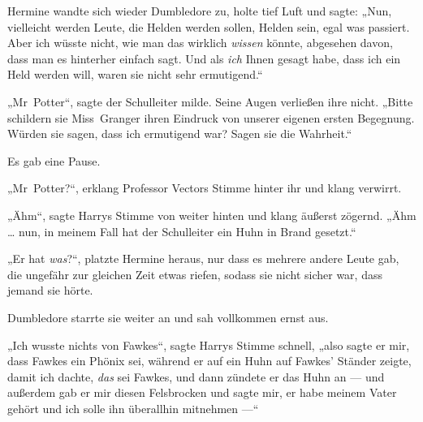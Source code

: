 Hermine wandte sich wieder Dumbledore zu, holte tief Luft und sagte:
„Nun, vielleicht werden Leute, die Helden werden sollen, Helden sein, egal was passiert. Aber ich wüsste nicht, wie man das wirklich \emph{wissen} könnte, abgesehen davon, dass man es hinterher einfach sagt. Und als \emph{ich} Ihnen gesagt habe, dass ich ein Held werden will, waren sie nicht sehr ermutigend.“

„Mr~Potter“, sagte der Schulleiter milde. Seine Augen verließen ihre nicht.
„Bitte schildern sie Miss~Granger ihren Eindruck von unserer eigenen ersten Begegnung. Würden sie sagen, dass ich ermutigend war? Sagen sie die Wahrheit.“

Es gab eine Pause.

„Mr~Potter?“, erklang Professor Vectors Stimme hinter ihr und klang verwirrt.

„Ähm“, sagte Harrys Stimme von weiter hinten und klang äußerst zögernd. „Ähm … nun, in meinem Fall hat der Schulleiter ein Huhn in Brand gesetzt.“

„Er hat \emph{was}?“, platzte Hermine heraus, nur dass es mehrere andere Leute gab, die ungefähr zur gleichen Zeit etwas riefen, sodass sie nicht sicher war, dass jemand sie hörte.

Dumbledore starrte sie weiter an und sah vollkommen ernst aus.

„Ich wusste nichts von Fawkes“, sagte Harrys Stimme schnell, „also sagte er mir, dass Fawkes ein Phönix sei, während er auf ein Huhn auf Fawkes’ Ständer zeigte, damit ich dachte, \emph{das} sei Fawkes, und dann zündete er das Huhn an — und außerdem gab er mir diesen Felsbrocken und sagte mir, er habe meinem Vater gehört und ich solle ihn überallhin mitnehmen —“


